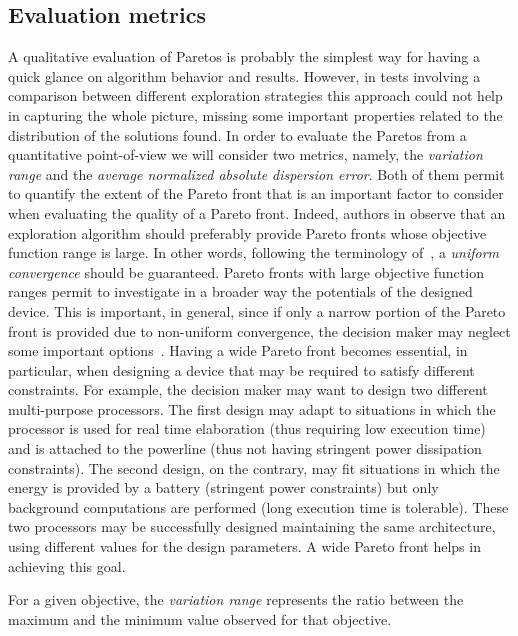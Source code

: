 \subsection{Evaluation metrics}
A qualitative evaluation of Paretos is probably the simplest way for
having a quick glance on algorithm behavior and results. However, in
tests involving a comparison between different exploration strategies
this approach could not help in capturing the whole picture, missing
some important properties related to the distribution of the solutions
found.
In order to evaluate the Paretos from a quantitative point-of-view we
will consider two metrics, namely, the \emph{variation range} and the
\emph{average normalized absolute dispersion error}. Both of them permit to quantify the extent of the Pareto front that is an important factor to consider when evaluating the quality of a Pareto front. Indeed, authors in \cite{zitzler_ec00,weise2012evolutionary} observe that an exploration algorithm should preferably provide Pareto fronts whose objective function range is large. In other words, following the terminology of~\cite{weise2012evolutionary}, a \emph{uniform convergence} should be guaranteed.
Pareto fronts with large objective function ranges permit to investigate in a broader way the potentials of the designed device. This is important, in general, since if only a narrow portion of the Pareto front is provided due to non-uniform convergence, the decision maker may neglect some important options~\cite{weise2012evolutionary}. Having a wide Pareto front becomes essential, in particular, when designing a device that may be required to satisfy different constraints. For example, the decision maker may want to design two different multi-purpose processors. The first design may adapt to situations in which the processor is used for real time elaboration (thus requiring low execution time) and is attached to the powerline (thus not having stringent power dissipation constraints). The second design, on the contrary, may fit situations in which the energy is provided by a battery (stringent power constraints) but only background computations are performed (long execution time is tolerable). These two processors may be successfully designed maintaining the same architecture, using different values for the design parameters. A wide Pareto front helps in achieving this goal.

For a given objective, the \emph{variation range} represents the ratio
between the maximum and the minimum value observed for that objective.

